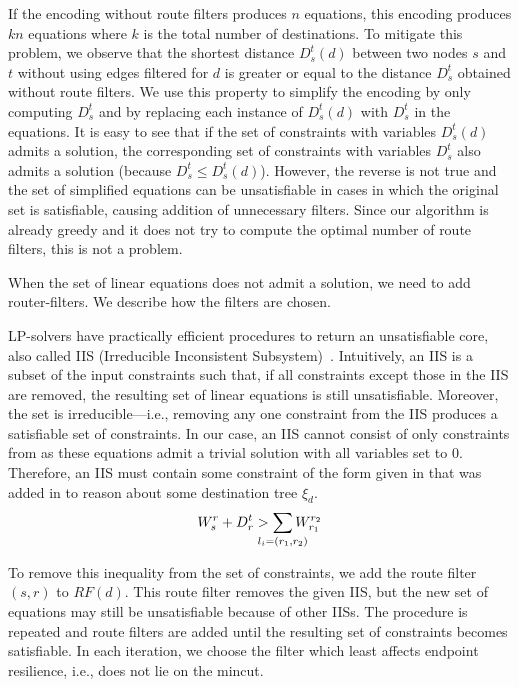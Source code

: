 If the encoding without route filters produces $n$ equations, this
encoding produces $kn$ equations where $k$ is the total number of destinations.  
To mitigate this problem, we observe that the shortest distance $D_s^t(d)$ between two
nodes $s$ and $t$ without using edges filtered for $d$ is
greater or equal to the distance $D_s^t$ obtained without route filters.  
We use this property to simplify the
encoding by only computing $D_s^t$ and by replacing each instance of
$D_s^t(d)$ with $D_s^t$ in the equations.  It is easy to see that 
if the set of constraints with variables $D_s^t(d)$ admits a solution,
the corresponding set of constraints with variables $D_s^t$ 
also admits a solution (because $D_s^t\leq
D_s^t(d)$).  However, the reverse is not true and the set of
simplified equations can be unsatisfiable in cases in which the
original set is satisfiable, causing addition of unnecessary filters.
Since our algorithm is already greedy and it does not try to compute the optimal 
number of route filters, this is not a problem.


When the set of linear equations does not admit a solution, we 
need to add router-filters. We describe how the filters are chosen.

LP-solvers have practically efficient procedures to return an
unsatisfiable core, also called IIS (Irreducible Inconsistent Subsystem)~\cite{chinneck2007feasibility}. 
Intuitively, an IIS is a subset of the input constraints such that,
if all constraints except those in the IIS are removed, the resulting set of
linear equations is still unsatisfiable. Moreover, the set is irreducible---i.e., removing 
any one constraint from the IIS produces a satisfiable set of constraints. 
In our case, an IIS cannot consist of only 
constraints from  as these equations
admit a trivial solution with all variables set to 0. 
Therefore, an IIS must contain some constraint of the form
given in  
that was added in to reason about some destination tree $\xi_d$.
\[
W_s^r + D_r^t  > \sum_{\mathclap{\substack{l_i=(r_1,r_2)}}} 
		W_{r_1}^{r_2}
\]		


To remove this inequality from the set of constraints, we add the route filter $(s,r)$ to $RF(d)$.
This route filter removes the given IIS, but the new set of equations may still be unsatisfiable because of other IISs. 
The procedure is repeated and route filters are added until the resulting set of constraints becomes satisfiable. In each iteration, we choose the filter
which least affects endpoint resilience, i.e., does not lie on the mincut.




